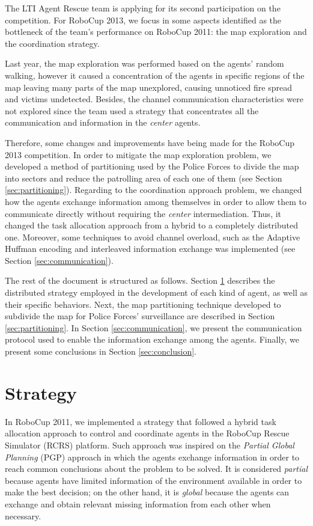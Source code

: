 \documentclass{llncs}
\begin{document}
The LTI Agent Rescue team is applying for its second participation on the competition. For RoboCup 2013, we focus in some aspects identified as the bottleneck of the team's performance on RoboCup 2011: the map exploration and the coordination strategy.

Last year, the map exploration was performed based on the agents' random walking, however it caused a concentration of the agents in specific regions of the map leaving many parts of the map unexplored, causing unnoticed fire spread and victims undetected. Besides, the channel communication characteristics were not explored since the team used a strategy that concentrates all the communication and information in the {\it center} agents.

Therefore, some changes and improvements have being made for the RoboCup 2013 competition. In order to mitigate the map exploration problem, we developed a method of partitioning used by the Police Forces to divide the map into sectors and reduce the patrolling area of each one of them (see Section \ref{sec:partitioning}). Regarding to the coordination approach problem, we changed how the agents exchange information among themselves in order to allow them to communicate directly without requiring the {\it center} intermediation. Thus, it changed the task allocation approach from a hybrid to a completely distributed one. Moreover, some techniques to avoid channel overload, such as the Adaptive Huffman encoding \cite{huffman1952,vitter1987} and interleaved information exchange was implemented (see Section \ref{sec:communication}).

The rest of the document is structured as follows. Section \ref{sec:strategy} describes the distributed strategy employed in the development of each kind of agent, as well as their specific behaviors. Next, the map partitioning technique developed to subdivide the map for Police Forces' surveillance are described in Section \ref{sec:partitioning}. In Section \ref{sec:communication}, we present the communication protocol used to enable the information exchange among the agents. Finally, we present some conclusions in Section \ref{sec:conclusion}.
\section{Strategy}
\label{sec:strategy}
In RoboCup 2011, we implemented a strategy that followed a hybrid task allocation approach \cite{pereiraEtAl2011-robocup} to control and coordinate agents in the RoboCup Rescue Simulator (RCRS) platform. Such approach was inspired on the \textit{Partial Global Planning} (PGP) approach \cite{durfeeLesser1991} in which the agents exchange information in order to reach common conclusions about the problem to be solved. It is considered {\it partial} because agents have limited information of the environment available in order to make the best decision; on the other hand, it is {\it global} because the agents can exchange and obtain relevant missing information from each other when necessary.
\end{document}
